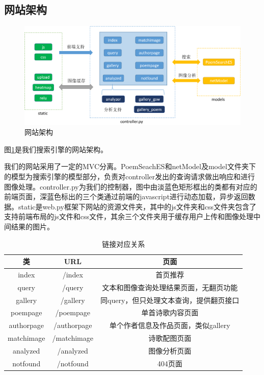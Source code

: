 \documentclass[a4paper, 10pt]{article}
\begin{document}
\subsection{网站架构}
\begin{figure}[H]
\centering
\includegraphics[scale=0.48]{fig/web_struct.png}
\caption{网站架构}
\label{fig:web_struct}
\end{figure}

图\ref{fig:web_struct}是我们搜索引擎的网站架构。

我们的网站采用了一定的MVC分离。PoemSeachES和netModel及model文件夹下的模型为搜索引擎的模型部分，负责对controller发出的查询请求做出响应和进行图像处理。controller.py为我们的控制器，图中由淡蓝色矩形框出的类都有对应的前端页面，深蓝色标出的三个类通过前端的javascript进行动态加载，异步返回数据。static是web.py框架下网站的资源文件夹，其中的js文件夹和css文件夹包含了支持前端布局的js文件和css文件，其余三个文件夹用于缓存用户上传和图像处理中间结果的图片。

\begin{table}[H]
\centering
\begin{tabular}{ccc}
\hline
\textbf{类} & \textbf{URL} & \textbf{页面} \\ \hline
index & /index & 首页推荐 \\
query & /query & 文本和图像查询处理结果页面，无翻页功能 \\ 
gallery & /gallery & 同query，但只处理文本查询，提供翻页接口 \\ 
poempage & /poempage & 单首诗歌内容页面 \\ 
authorpage & /authorpage & 单个作者信息及作品页面，类似gallery \\ 
matchimage & /matchimage & 诗歌配图页面 \\ 
analyzed & /analyzed & 图像分析页面 \\ 
notfound & /notfound & 404页面 \\ \hline
\end{tabular}
\caption{链接对应关系}
\label{tab:url_connect}
\end{table}
\end{document}
